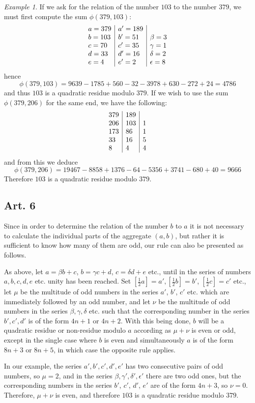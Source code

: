 \documentclass{book}
\theoremstyle{plain}
\theoremstyle{remark}
\newtheorem*{example}{Example}
\begin{document}
\begin{example} If we ask for the relation of the number $103$ to the number $379$, we must first compute the sum $\phi(379,103)$:
\[ 
\begin{array}{l | l | l } 
a=379 & a' = 189 & \\
b=103&b'=51&\beta=3 \\
c=70 & c' = 35 & \gamma=1 \\
d=33 & d'=16 & \delta = 2 \\
e=4& e' = 2 & \epsilon=8 
\end{array}
\]
hence
\[ \phi(379,103) = 9639-1785+560-32-3978+630-272+24 = 4786 \]
and thus $103$ is a quadratic residue modulo $379$.  If we wish to use the sum $\phi(379,206)$ for the same end, we have the following:
\[ 
\begin{array}{l | l | l } 
379 & 189 & \\
206&103&1 \\
173 & 86 & 1 \\
33 & 16 & 5 \\
8& 4 & 4 
\end{array}
\]
and from this we deduce 
\[ \phi(379,206) = 19467-8858+1376-64-5356+3741-680+40=9666 \]
Therefore $103$ is a quadratic residue modulo $379$. 
\end{example}

\subsection*{Art. 6} 

Since in order to determine the relation of the number $b$ to $a$ it is not necessary to calculate the individual parts of the aggregate $(a,b)$, but rather it is sufficient to know how many of them are odd, our rule can also be presented as follows.

As above, let $a = \beta b + c$, $b=\gamma c + d$, $c = \delta d + e$ etc., until in the series of numbers $a, b, c, d, e$ etc. unity has been reached.  Set $[\tfrac{1}{2} a] = a', [\tfrac{1}{2} b] = b'$, $[\tfrac{1}{2} c] = c'$ etc., let $\mu$ be the multitude of odd numbers in the series $a'$, $b'$, $c'$ etc. which are immediately followed by an odd number, and let $\nu$ be the multitude of odd numbers in the series $\beta, \gamma, \delta$ etc. such that the corresponding number in the series $b', c', d'$ is of the form $4n+1$ or $4n+2$.   With this being done, $b$ will be a quadratic residue or non-residue modulo $a$ according as $\mu + \nu$ is even or odd, except in the single case where $b$ is even and simultaneously $a$ is of the form $8n+3$ or $8n+5$, in which case the opposite rule applies. 

In our example, the series $a',b',c',d',e'$ has two consecutive pairs of odd numbers, so $\mu = 2$, and in the series $\beta, \gamma', \delta', \epsilon'$ there are two odd ones, but the corresponding numbers in the series  $b'$, $c'$, $d'$, $e'$ are of the form $4n+3$, so $\nu = 0$.   Therefore, $\mu+\nu$ is even, and therefore $103$ is a quadratic residue modulo $379$. 
\end{document}
